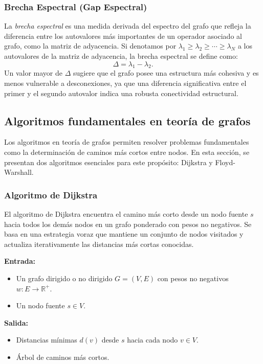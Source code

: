 \documentclass[openany]{book}
\begin{document}
			\subsubsection{Brecha Espectral (Gap Espectral)}
			La \emph{brecha espectral} es una medida derivada del espectro del grafo que refleja la diferencia entre los autovalores más importantes de un operador asociado al grafo, como la matriz de adyacencia. Si denotamos por $\lambda_1 \geq \lambda_2 \geq \cdots \geq \lambda_N$ a los autovalores de la matriz de adyacencia, la brecha espectral se define como:
			\begin{equation}
				\Delta = \lambda_1 - \lambda_2.
			\end{equation}
			Un valor mayor de $\Delta$ sugiere que el grafo posee una estructura más cohesiva y es menos vulnerable a desconexiones, ya que una diferencia significativa entre el primer y el segundo autovalor indica una robusta conectividad estructural.

		\subsection{Algoritmos fundamentales en teoría de grafos}
			Los algoritmos en teoría de grafos permiten resolver problemas fundamentales como la determinación de caminos más cortos entre nodos. En esta sección, se presentan dos algoritmos esenciales para este propósito: Dijkstra y Floyd-Warshall.

			\subsubsection{Algoritmo de Dijkstra}

			El algoritmo de Dijkstra encuentra el camino más corto desde un nodo fuente $s$ hacia todos los demás nodos en un grafo ponderado con pesos no negativos. Se basa en una estrategia voraz que mantiene un conjunto de nodos visitados y actualiza iterativamente las distancias más cortas conocidas.

			\textbf{Entrada:}
			\begin{itemize}
				\item Un grafo dirigido o no dirigido $G = (V, E)$ con pesos no negativos $w: E \to \mathbb{R}^+$.
				\item Un nodo fuente $s \in V$.
			\end{itemize}

			\textbf{Salida:}
			\begin{itemize}
				\item Distancias mínimas $d(v)$ desde $s$ hacia cada nodo $v \in V$.
				\item Árbol de caminos más cortos.
			\end{itemize}
\end{document}

